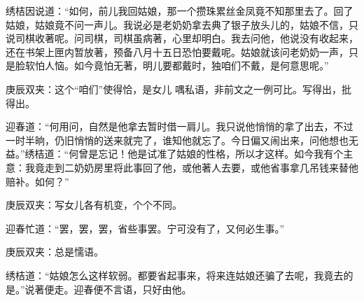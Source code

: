 \begin{parag}
    绣桔因说道：“如何，前儿我回姑娘，那一个攒珠累丝金凤竟不知那里去了。回了姑娘，姑娘竟不问一声儿。我说必是老奶奶拿去典了银子放头儿的，姑娘不信，只说司棋收著呢。问司棋，司棋虽病著，心里却明白。我去问他，他说没有收起来，还在书架上匣内暂放著，预备八月十五日恐怕要戴呢。姑娘就该问老奶奶一声，只是脸软怕人恼。如今竟怕无著，明儿要都戴时，独咱们不戴，是何意思呢。”\begin{note}庚辰双夹：这个“咱们”使得恰，是女儿 喁私语，非前文之一例可比。写得出，批得出。\end{note}迎春道：“何用问，自然是他拿去暂时借一肩儿。我只说他悄悄的拿了出去，不过一时半晌，仍旧悄悄的送来就完了，谁知他就忘了。今日偏又闹出来，问他想也无益。”绣桔道：“何曾是忘记！他是试准了姑娘的性格，所以才这样。如今我有个主意：我竟走到二奶奶房里将此事回了他，或他著人去要，或他省事拿几吊钱来替他赔补。如何？”\begin{note}庚辰双夹：写女儿各有机变，个个不同。\end{note}迎春忙道：“罢，罢，罢，省些事罢。宁可没有了，又何必生事。”\begin{note}庚辰双夹：总是懦语。\end{note}绣桔道：“姑娘怎么这样软弱。都要省起事来，将来连姑娘还骗了去呢，我竟去的是。”说著便走。迎春便不言语，只好由他。
\end{parag}


